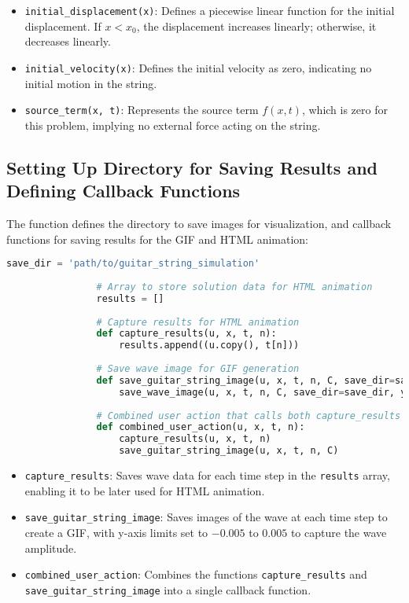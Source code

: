 \documentclass{article}
\begin{document}
			\begin{itemize}
				\item \texttt{initial\_displacement(x)}: Defines a piecewise linear function for the initial displacement. If \( x < x_0 \), the displacement increases linearly; otherwise, it decreases linearly.
				\item \texttt{initial\_velocity(x)}: Defines the initial velocity as zero, indicating no initial motion in the string.
				\item \texttt{source\_term(x, t)}: Represents the source term \( f(x, t) \), which is zero for this problem, implying no external force acting on the string.
			\end{itemize}
			
			\subsection{Setting Up Directory for Saving Results and Defining Callback Functions}
			
			The function defines the directory to save images for visualization, and callback functions for saving results for the GIF and HTML animation:
			
			\begin{lstlisting}[language=Python]
				save_dir = 'path/to/guitar_string_simulation'
				
				# Array to store solution data for HTML animation
				results = []
				
				# Capture results for HTML animation
				def capture_results(u, x, t, n):
					results.append((u.copy(), t[n]))
				
				# Save wave image for GIF generation
				def save_guitar_string_image(u, x, t, n, C, save_dir=save_dir, ymin=-0.005, ymax=0.005):
					save_wave_image(u, x, t, n, C, save_dir=save_dir, ymin=ymin, ymax=ymax)
				
				# Combined user action that calls both capture_results and save_wave_image
				def combined_user_action(u, x, t, n):
					capture_results(u, x, t, n)
					save_guitar_string_image(u, x, t, n, C)
			\end{lstlisting}
			
			\begin{itemize}
				\item \texttt{capture\_results}: Saves wave data for each time step in the \texttt{results} array, enabling it to be later used for HTML animation.
				\item \texttt{save\_guitar\_string\_image}: Saves images of the wave at each time step to create a GIF, with y-axis limits set to \( -0.005 \) to \( 0.005 \) to capture the wave amplitude.
				\item \texttt{combined\_user\_action}: Combines the functions \texttt{capture\_results} and \texttt{save\_guitar\_string\_image} into a single callback function.
			\end{itemize}
			
\end{document}
